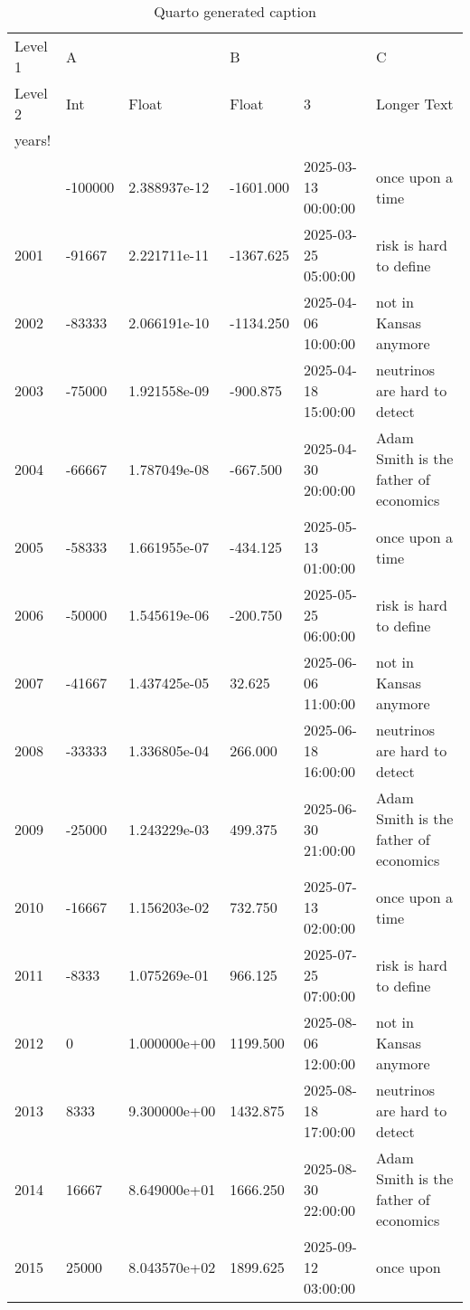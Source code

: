 \documentclass[
  12pt,
  a4paper,
  DIV=11,
  numbers=noendperiod]{scrartcl}
\begin{document}
\begin{longtable}[]{@{}llllll@{}}

\caption{\label{tbl-hard-rules}Quarto generated caption}

\tabularnewline

\toprule\noalign{}
Level 1 & \multicolumn{2}{l}{%
A} & \multicolumn{2}{l}{%
B} & C \\
Level 2 & Int & Float & Float & 3 & Longer Text \\
years! & & & & & \\
\midrule\noalign{}
\endhead
\bottomrule\noalign{}
\endlastfoot
2000 & -100000 & 2.388937e-12 & -1601.000 & 2025-03-13 00:00:00 & once
upon a time \\
2001 & -91667 & 2.221711e-11 & -1367.625 & 2025-03-25 05:00:00 & risk is
hard to define \\
2002 & -83333 & 2.066191e-10 & -1134.250 & 2025-04-06 10:00:00 & not in
Kansas anymore \\
2003 & -75000 & 1.921558e-09 & -900.875 & 2025-04-18 15:00:00 &
neutrinos are hard to detect \\
2004 & -66667 & 1.787049e-08 & -667.500 & 2025-04-30 20:00:00 & Adam
Smith is the father of economics \\
2005 & -58333 & 1.661955e-07 & -434.125 & 2025-05-13 01:00:00 & once
upon a time \\
2006 & -50000 & 1.545619e-06 & -200.750 & 2025-05-25 06:00:00 & risk is
hard to define \\
2007 & -41667 & 1.437425e-05 & 32.625 & 2025-06-06 11:00:00 & not in
Kansas anymore \\
2008 & -33333 & 1.336805e-04 & 266.000 & 2025-06-18 16:00:00 & neutrinos
are hard to detect \\
2009 & -25000 & 1.243229e-03 & 499.375 & 2025-06-30 21:00:00 & Adam
Smith is the father of economics \\
2010 & -16667 & 1.156203e-02 & 732.750 & 2025-07-13 02:00:00 & once upon
a time \\
2011 & -8333 & 1.075269e-01 & 966.125 & 2025-07-25 07:00:00 & risk is
hard to define \\
2012 & 0 & 1.000000e+00 & 1199.500 & 2025-08-06 12:00:00 & not in Kansas
anymore \\
2013 & 8333 & 9.300000e+00 & 1432.875 & 2025-08-18 17:00:00 & neutrinos
are hard to detect \\
2014 & 16667 & 8.649000e+01 & 1666.250 & 2025-08-30 22:00:00 & Adam
Smith is the father of economics \\
2015 & 25000 & 8.043570e+02 & 1899.625 & 2025-09-12 03:00:00 & once upon

\end{longtable}
\end{document}
